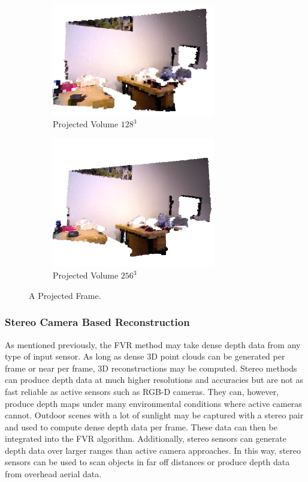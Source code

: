 \begin{figure}[!htb]
         \begin{subfigure}[b]{2.8in}
                \includegraphics[width=2.8in]{images/ch2/volumeF11128}
                \caption{Projected Volume $128^3$}
                \label{fig:VOLUMEEXAMPLE128}
        \end{subfigure}%
         \begin{subfigure}[b]{2.8in}
                \includegraphics[width=2.8in]{images/ch2/volumeF11256}
                \caption{Projected Volume $256^3$}
                \label{fig:VOLUMEEXAMPLE384}
        \end{subfigure}%
       \caption{A Projected Frame.}
       \label{fig:PROJECTED_FRAME}
\end{figure}

\subsubsection{Stereo Camera Based Reconstruction}
\label{subsec:SCBR}
As mentioned previously, the FVR method may take dense depth data from any type of input sensor. As long as dense 3D point clouds can be generated per frame or near per frame, 3D reconstructions may be computed. Stereo methods can produce depth data at much higher resolutions and accuracies but are not as fast reliable as active sensors such as RGB-D cameras. They can, however, produce depth maps under many environmental conditions where active cameras cannot. Outdoor scenes with a lot of sunlight may be captured with a stereo pair and used to compute dense depth data per frame. These data can then be integrated into the FVR algorithm. Additionally, stereo sensors can generate depth data over larger ranges than active camera approaches. In this way, stereo sensors can be used to scan objects in far off distances or produce depth data from overhead aerial data. \\


